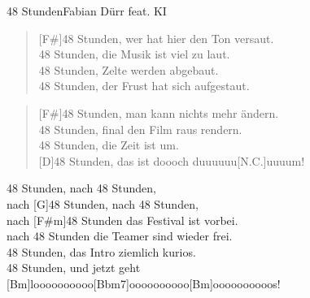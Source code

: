 \begin{song}{48 Stunden}{Fabian Dürr feat. KI}
    \begin{verse}
        [F#]48 Stunden, wer hat hier den Ton versaut.\\
        [C#]48 Stunden, die Musik ist viel zu laut. \\
        [G#m]48 Stunden, Zelte werden abgebaut.\\
        [D]48 Stunden, der Frust hat sich aufgestaut. \\
    \end{verse}

    \begin{verse}
        [F#]48 Stunden, man kann nichts mehr ändern. \\
        [C#]48 Stunden, final den Film raus rendern. \\
        [G#m]48 Stunden, die Zeit ist um.\\

        [D]48 Stunden, das ist doooch duuuuuu[N.C.]uuuum! \\
    \end{verse}

    \begin{bridge}
        [F#m]48 Stunden, nach 48 Stunden, \\
        nach [G]48 Stunden, nach 48 Stunden, \\
        nach [F#m]48 Stunden das Festival ist vorbei.\\
        [G]nach 48 Stunden die Teamer sind wieder frei.\\
        [F#m]48 Stunden, das Intro ziemlich kurios. \\
        [G]48 Stunden, und jetzt geht [Bm]loooooooooo[Bbm7]oooooooooo[Bm]oooooooooos!\\
    \end{bridge}

\end{song}
